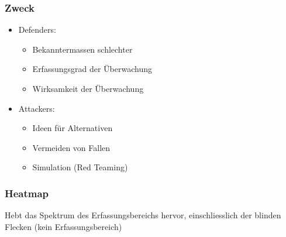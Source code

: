 \subsubsection{Zweck}
\begin{itemize}
    \item Defenders:
    \begin{itemize}
        \item Bekanntermassen schlechter
        \item Erfassungsgrad der Überwachung
        \item Wirksamkeit der Überwachung
    \end{itemize}
    \item Attackers:
    \begin{itemize}
        \item Ideen für Alternativen
        \item Vermeiden von Fallen
        \item Simulation (Red Teaming)
    \end{itemize}
\end{itemize}

\subsubsection{Heatmap}
Hebt das Spektrum des Erfassungsbereichs hervor, einschliesslich der blinden Flecken (kein Erfassungsbereich)
